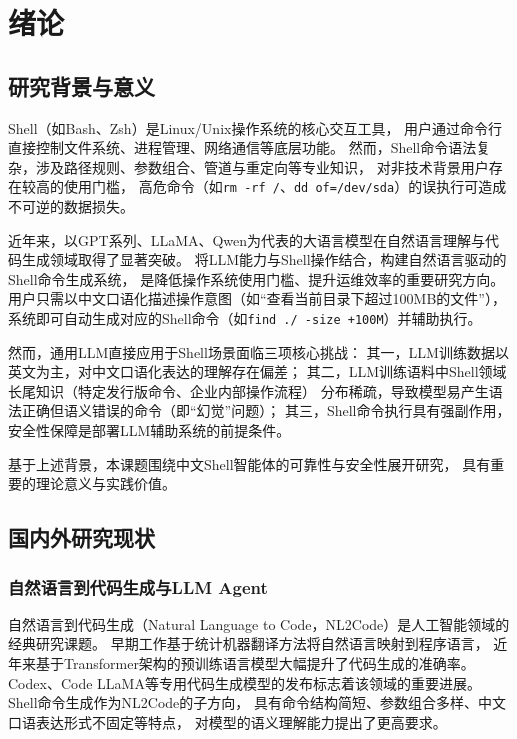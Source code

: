 \chapter{绪\hspace{6pt}论}

\section{研究背景与意义}

Shell（如Bash、Zsh）是Linux/Unix操作系统的核心交互工具，
用户通过命令行直接控制文件系统、进程管理、网络通信等底层功能。
然而，Shell命令语法复杂，涉及路径规则、参数组合、管道与重定向等专业知识，
对非技术背景用户存在较高的使用门槛，
高危命令（如\texttt{rm -rf /}、\texttt{dd of=/dev/sda}）的误执行可造成不可逆的数据损失。

近年来，以GPT系列、LLaMA、Qwen为代表的大语言模型在自然语言理解与代码生成领域取得了显著突破。
将LLM能力与Shell操作结合，构建自然语言驱动的Shell命令生成系统，
是降低操作系统使用门槛、提升运维效率的重要研究方向。
用户只需以中文口语化描述操作意图（如“查看当前目录下超过100MB的文件”），
系统即可自动生成对应的Shell命令（如\texttt{find ./ -size +100M}）并辅助执行。

然而，通用LLM直接应用于Shell场景面临三项核心挑战：
其一，LLM训练数据以英文为主，对中文口语化表达的理解存在偏差；
其二，LLM训练语料中Shell领域长尾知识（特定发行版命令、企业内部操作流程）
分布稀疏，导致模型易产生语法正确但语义错误的命令（即“幻觉”问题）；
其三，Shell命令执行具有强副作用，安全性保障是部署LLM辅助系统的前提条件。

基于上述背景，本课题围绕中文Shell智能体的可靠性与安全性展开研究，
具有重要的理论意义与实践价值。

\section{国内外研究现状}

\subsection{自然语言到代码生成与LLM Agent}

自然语言到代码生成（Natural Language to Code，NL2Code）是人工智能领域的经典研究课题。
早期工作基于统计机器翻译方法将自然语言映射到程序语言，
近年来基于Transformer架构的预训练语言模型大幅提升了代码生成的准确率。
Codex、Code LLaMA等专用代码生成模型的发布标志着该领域的重要进展。
Shell命令生成作为NL2Code的子方向，
具有命令结构简短、参数组合多样、中文口语表达形式不固定等特点，
对模型的语义理解能力提出了更高要求。

